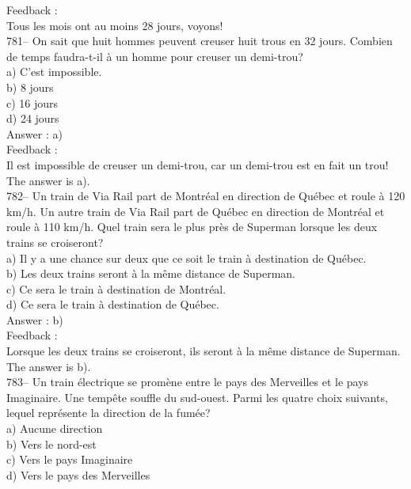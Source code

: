 \documentclass[letterpaper, 12pt]{article}
\begin{document}
Feedback : \\
Tous les mois ont au moins 28 jours, voyons!  \\

781-- On sait que huit hommes peuvent creuser huit trous en 32 jours.
Combien de temps faudra-t-il \`a un homme pour creuser un demi-trou?\\
a) C'est impossible.\\
b) 8 jours\\
c) 16 jours\\
d) 24 jours\\

Answer : a)\\

Feedback : \\
Il est impossible de creuser un demi-trou, car un demi-trou est en fait un
trou!  The answer is a).\\

782-- Un train de Via Rail part de Montr\'eal en direction de Qu\'ebec et
roule \`a 120 km/h.  Un autre train de Via Rail part de Qu\'ebec en
direction de Montr\'eal et roule \`a 110 km/h.  Quel train sera le plus
pr\`es de Superman lorsque les deux trains  se croiseront?\\
a) Il y a une chance sur deux que ce soit le train \`a destination de
Qu\'ebec.\\
b) Les deux trains seront \`a la m\^eme distance de Superman.\\
c) Ce sera le train \`a destination de Montr\'eal.\\
d) Ce sera le train \`a destination de Qu\'ebec.\\

Answer : b)\\

Feedback : \\
Lorsque les deux trains se croiseront, ils seront \`a la m\^eme distance de
Superman.  The answer is b).\\

783-- Un train \'electrique se prom\`ene entre le pays des Merveilles et le
pays Imaginaire.  Une temp\^ete souffle du sud-ouest.  Parmi les quatre
choix suivants, lequel repr\'esente la direction de la fum\'ee?\\
a) Aucune direction\\
b) Vers le nord-est\\
c) Vers le pays Imaginaire\\
d) Vers le pays des Merveilles\\
\end{document}
